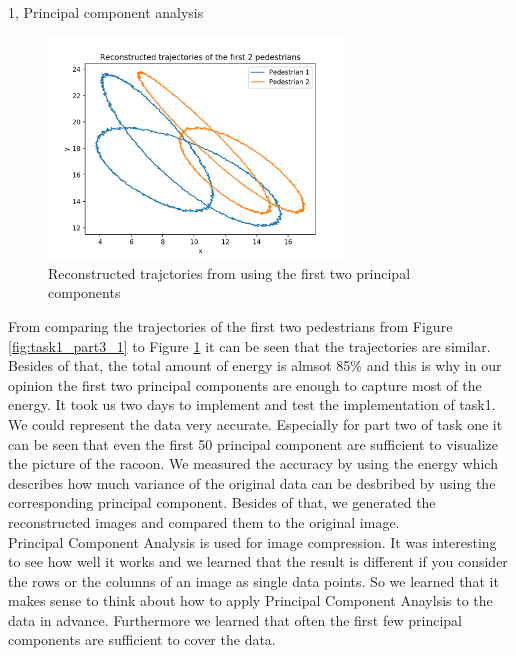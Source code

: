 \documentclass[10pt,a4paper]{article}
\begin{document}
\begin{task}{1, Principal component analysis}
\begin{figure}[H]
\centering
\includegraphics[width=0.7\textwidth]{../plots/task1/Task1_3reconstructed.png}
\caption{Reconstructed trajctories from using the first two principal components}
\label{fig:task1_part3_2}
\end{figure}
From comparing the trajectories of the first two pedestrians from Figure \ref{fig:task1_part3_1} to Figure \ref{fig:task1_part3_2} it can be seen that the trajectories are similar. Besides of that, the total amount of energy is almsot 85\% and this is why in our opinion the first two principal components are enough to capture most of the energy.
\bigbreak
It took us two days to implement and test the implementation of task1. \\We could represent the data very accurate. Especially for part two of task one it can be seen that even the first 50 principal component are sufficient to visualize the picture of the racoon. We measured the accuracy by using the energy which describes how much variance of the original data can be desbribed by using the corresponding principal component. Besides of that, we generated the reconstructed images and compared them to the original image. \\
Principal Component Analysis is used for image compression. It was interesting to see how well it works and we learned that the result is different if you consider the rows or the columns of an image as single data points. So we learned that it makes sense to think about how to apply Principal Component Anaylsis to the data in advance. Furthermore we learned that often the first few principal components are sufficient to cover the data. 
\end{task}
\end{document}
